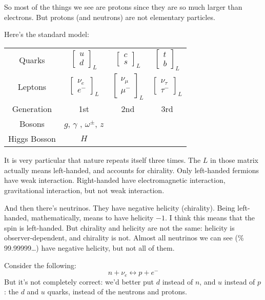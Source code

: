 So most of the things we see are protons since they are so much larger than
electrons. But protons (and neutrons) are not elementary particles.

Here's the standard model:
\begin{tabular}{c c c c}
Quarks & $\begin{bmatrix} u\\d \end{bmatrix}_L $ & $\begin{bmatrix} c\\s
\end{bmatrix}_L$ & $\begin{bmatrix} t\\b \end{bmatrix}_L$\\
Leptons & $\begin{bmatrix} \nu_e\\e^- \end{bmatrix}_L $ & $\begin{bmatrix}
\nu_\mu\\ \mu^-
\end{bmatrix}_L$ & $\begin{bmatrix} \nu_\tau\\ \tau^- \end{bmatrix}_L$\\
Generation & 1st & 2nd & 3rd\\
Bosons & $g$, $\gamma$ , $\omega^\pm$, $z$ \\
Higgs Bosson & $H$
\end{tabular}
It is very particular that nature repeats itself three times. The $L$ in those
matrix actually means left-handed, and accounts for chirality. Only left-handed
fermions have weak interaction. Right-handed have electromagnetic interaction,
gravitational interaction, but not weak interaction.

\medskip

And then there's neutrinos. They have negative helicity (chirality). Being
left-handed, mathematically, means to have helicity $-1$. I think this means
that the spin is left-handed. But chirality and helicity are not the same:
helicity is observer-dependent, and chirality is not. Almost all neutrinos we
can see (\% 99.99999…) have negative helicity, but not all of them.

Consider the following:
$$
n+\nu_e\leftrightarrow p+e^-
$$
But it's not completely correct: we'd better put $d$ instead of $n$, and $u$
instead of $p$: the $d$ and $u$ quarks, instead of the neutrons and protons.


